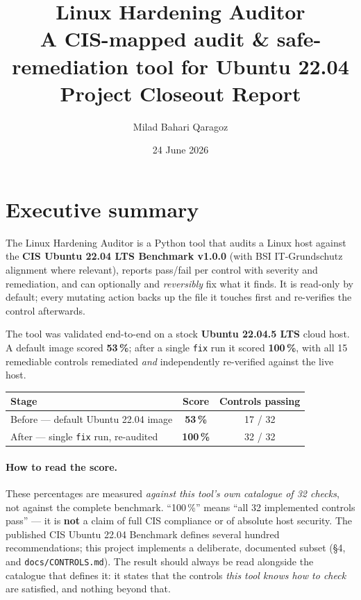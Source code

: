 \documentclass[11pt,a4paper]{article}
\title{\vspace{-1.2cm}\color{accent}\Huge\textbf{Linux Hardening Auditor}\\[4pt]
\Large A CIS-mapped audit \& safe-remediation tool for Ubuntu 22.04\\[10pt]
\large\normalcolor Project Closeout Report}
\author{Milad Bahari Qaragoz}
\date{24 June 2026}
\begin{document}
\maketitle
\thispagestyle{fancy}

\section{Executive summary}
The Linux Hardening Auditor is a Python tool that audits a Linux host against the
\textbf{CIS Ubuntu 22.04 LTS Benchmark v1.0.0} (with BSI IT-Grundschutz alignment where
relevant), reports pass/fail per control with severity and remediation, and can optionally and
\emph{reversibly} fix what it finds. It is read-only by default; every mutating action backs up
the file it touches first and re-verifies the control afterwards.

The tool was validated end-to-end on a stock \textbf{Ubuntu 22.04.5 LTS} cloud host. A default
image scored \textbf{53\,\%}; after a single \texttt{fix} run it scored \textbf{100\,\%}, with
all 15 remediable controls remediated \emph{and} independently re-verified against the live host.

\begin{center}
\renewcommand{\arraystretch}{1.3}
\begin{tabular}{l c c}
\toprule
\textbf{Stage} & \textbf{Score} & \textbf{Controls passing} \\
\midrule
Before --- default Ubuntu 22.04 image & \textcolor{bad}{\textbf{53\,\%}} & 17 / 32 \\
After --- single \texttt{fix} run, re-audited & \textcolor{ok}{\textbf{100\,\%}} & 32 / 32 \\
\bottomrule
\end{tabular}
\end{center}

\paragraph{How to read the score.} These percentages are measured \emph{against this tool's own
catalogue of 32 checks}, not against the complete benchmark. ``100\,\%'' means ``all 32
implemented controls pass'' --- it is \textbf{not} a claim of full CIS compliance or of absolute
host security. The published CIS Ubuntu 22.04 Benchmark defines several hundred recommendations;
this project implements a deliberate, documented subset (\S4, and \texttt{docs/CONTROLS.md}). The
result should always be read alongside the catalogue that defines it: it states that the controls
\emph{this tool knows how to check} are satisfied, and nothing beyond that.
\end{document}
